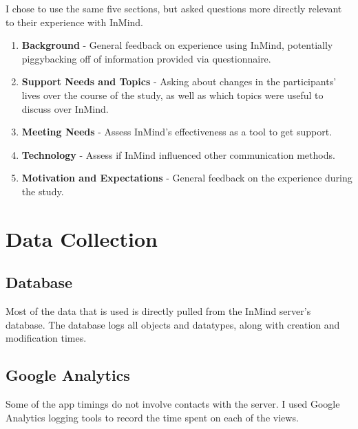   I chose to use the same five sections,
  but asked questions more directly relevant to their experience with InMind.
  \begin{enumerate}
  \item \textbf{Background} - 
  General feedback on experience using InMind,
  potentially piggybacking off of information provided via questionnaire.
  \item \textbf{Support Needs and Topics} - 
  Asking about changes in the participants' lives over the course of the study,
  as well as which topics were useful to discuss over InMind.
  \item \textbf{Meeting Needs} - 
  Assess InMind's effectiveness as a tool to get support.
  \item \textbf{Technology} - 
  Assess if InMind influenced other communication methods.
  \item \textbf{Motivation and Expectations} - 
  General feedback on the experience during the study.
  \end{enumerate}

\section{Data Collection}
  \subsection{Database}
    Most of the data that is used is directly pulled from
    the InMind server's database.
    The database logs all objects and datatypes,
    along with creation and modification times.

  \subsection{Google Analytics}
    Some of the app timings do not involve contacts with the server.
    I used Google Analytics logging tools to record the time spent
    on each of the views.
